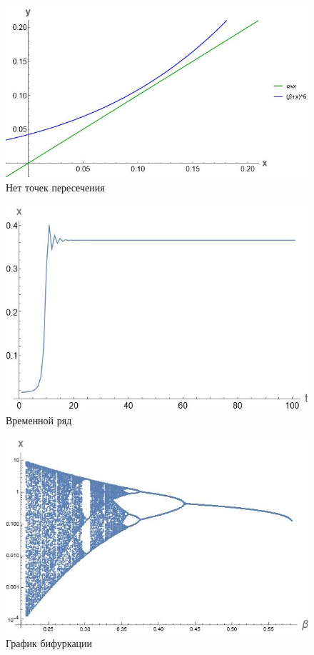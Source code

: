 \documentclass[14pt]{extarticle}
\begin{document}
        \begin{figure}[h]
            \centering
            \includegraphics[width=\textwidth]{images/zero_intersection.jpg}
            \caption{Нет точек пересечения}
        \end{figure}

        \begin{figure}[h]
            \centering
            \includegraphics[width=\textwidth]{images/time_series.jpg}
            \caption{Временной ряд}
        \end{figure}

        \begin{figure}[h]
            \centering
            \includegraphics[width=\textwidth]{images/bifurcation.jpg}
            \caption{График бифуркации}
        \end{figure}
\end{document}
